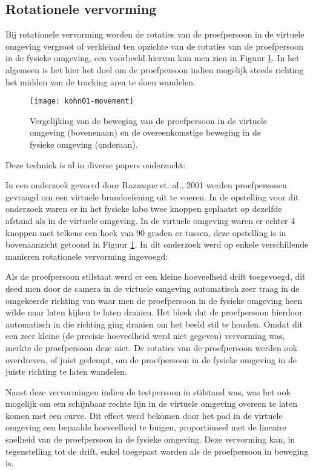 \subsection{Rotationele vervorming} \label{1:rotation}
Bij rotationele vervorming worden de rotaties van de proefpersoon in de 
virtuele omgeving vergroot of verkleind ten opzichte van de rotaties van de 
proefpersoon in de fysieke omgeving, een voorbeeld hiervan kan men zien in Figuur 
\ref{fig:kohn01-movement}. In het algemeen is het hier het doel om de
proefpersoon indien mogelijk steeds richting het midden van de tracking area
te doen wandelen.

\begin{figure}[t!]
    \centering
    \texttt{[image: kohn01-movement]}
    \caption{Vergelijking van de beweging van de proefpersoon in de virtuele
    omgeving (bovenenaan) en de overeenkomstige beweging in de fysieke omgeving 
    (onderaan).\cite{kohn01}}
    \label{fig:kohn01-movement}
\end{figure}

Deze techniek is al in diverse papers onderzocht:

In een onderzoek gevoerd door Razzaque et. al., 2001 \cite{kohn01} werden 
proefpersonen gevraagd om een virtuele brandoefening uit te voeren. In de 
opstelling voor dit onderzoek waren er in het fysieke labo twee knoppen geplaatst
op dezelfde afstand als in de virtuele omgeving. In de virtuele omgeving waren er
echter 4 knoppen met telkens een hoek van 90 graden er tussen, deze opstelling is
in bovenaanzicht getoond in Figuur \ref{fig:kohn01-movement}. In dit onderzoek
werd op enkele verschillende manieren rotationele vervorming ingevoegd:

Als de proefpersoon stilstaat werd er een kleine hoeveelheid drift toegevoegd, 
dit deed men door de camera in de virtuele omgeving automatisch zeer traag in de 
omgekeerde richting van waar men de proefpersoon in de fysieke omgeving heen 
wilde naar laten kijken te laten draaien. Het bleek dat de proefpersoon hierdoor 
automatisch in die richting ging draaien om het beeld stil te houden. Omdat dit 
een zeer kleine (de precisie hoeveelheid werd niet gegeven) vervorming was, 
merkte de proefpersoon deze niet. De rotaties van de proefpersoon werden ook 
overdreven, of juist gedempt, om de proefpersoon in de fysieke omgeving in de 
juiste richting te laten wandelen.

Naast deze vervormingen indien de testpersoon in stilstand was, was het ook
mogelijk om een schijnbaar rechte lijn in de virtuele omgeving overeen te laten
komen met een curve. Dit effect werd bekomen door het pad in de virtuele omgeving
een bepaalde hoeveelheid te buigen, proportioneel met de lineaire snelheid van
de proefpersoon in de fysieke omgeving. Deze vervorming kan, in tegenstelling tot
de drift, enkel toegepast worden als de proefpersoon in beweging is.


